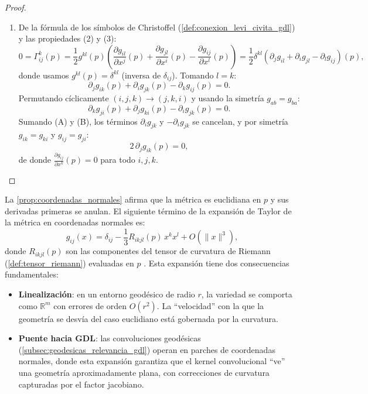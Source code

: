 \begin{proof}
\begin{enumerate}
	\item De la fórmula de los símbolos de Christoffel (\autoref{def:conexion_levi_civita_gdl}) y las propiedades (2) y (3):
	\[
	0 = \Gamma^k_{ij}(p) = \frac{1}{2}g^{kl}(p)\left(\frac{\partial g_{il}}{\partial x^j}(p) + \frac{\partial g_{jl}}{\partial x^i}(p) - \frac{\partial g_{ij}}{\partial x^l}(p)\right) = \frac{1}{2}\delta^{kl}\left(\partial_j g_{il} + \partial_i g_{jl} - \partial_l g_{ij}\right)\!(p),
	\]
	donde usamos $g^{kl}(p) = \delta^{kl}$ (inversa de $\delta_{ij}$). Tomando $l = k$:
	\begin{equation}\tag{A}
	\partial_j g_{ik}(p) + \partial_i g_{jk}(p) - \partial_k g_{ij}(p) = 0.
	\end{equation}
	Permutando cíclicamente $(i,j,k) \to (j,k,i)$ y usando la simetría $g_{ab} = g_{ba}$:
	\begin{equation}\tag{B}
	\partial_k g_{ji}(p) + \partial_j g_{ki}(p) - \partial_i g_{jk}(p) = 0.
	\end{equation}
	Sumando (A) y (B), los términos $\partial_i g_{jk}$ y $-\partial_i g_{jk}$ se cancelan, y por simetría $g_{ik} = g_{ki}$ y $g_{ij} = g_{ji}$:
	\[
	2\,\partial_j g_{ik}(p) = 0,
	\]
	de donde $\frac{\partial g_{ij}}{\partial x^k}(p) = 0$ para todo $i, j, k$. \qedhere
\end{enumerate}
\end{proof}

\begin{remark}\label{rem:coordenadas_normales_linealizacion}
La \autoref{prop:coordenadas_normales} afirma que la métrica es euclidiana en $p$ y sus derivadas primeras se anulan. El siguiente término de la expansión de Taylor de la métrica en coordenadas normales es:
\begin{equation}\label{eq:expansion_metrica_normales}
g_{ij}(x) = \delta_{ij} - \frac{1}{3} R_{ikjl}(p) \, x^k x^l + O(\|x\|^3),
\end{equation}
donde $R_{ikjl}(p)$ son las componentes del tensor de curvatura de Riemann (\autoref{def:tensor_riemann}) evaluadas en $p$ \citep[Lema~5.10]{lee2018introduction}. Esta expansión tiene dos consecuencias fundamentales:
\begin{itemize}
	\item \textbf{Linealización}: en un entorno geodésico de radio $r$, la variedad se comporta como $\mathbb{R}^m$ con errores de orden $O(r^2)$. La ``velocidad'' con la que la geometría se desvía del caso euclidiano está gobernada por la curvatura.
	\item \textbf{Puente hacia GDL}: las convoluciones geodésicas (\autoref{subsec:geodesicas_relevancia_gdl}) operan en parches de coordenadas normales, donde esta expansión garantiza que el kernel convolucional ``ve'' una geometría aproximadamente plana, con correcciones de curvatura capturadas por el factor jacobiano.
\end{itemize}
\end{remark}

